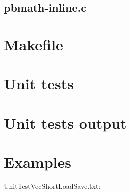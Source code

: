 \subsection{pbmath-inline.c}

\begin{scriptsize}
\begin{ttfamily}

\end{ttfamily}
\end{scriptsize}

\section{Makefile}

\begin{scriptsize}
\begin{ttfamily}

\end{ttfamily}
\end{scriptsize}

\section{Unit tests}

\begin{scriptsize}
\begin{ttfamily}

\end{ttfamily}
\end{scriptsize}

\section{Unit tests output}

\begin{scriptsize}
\begin{ttfamily}

\end{ttfamily}
\end{scriptsize}

\section{Examples}

UnitTestVecShortLoadSave.txt:\\
\begin{scriptsize}
\begin{ttfamily}

\end{ttfamily}
\end{scriptsize}

